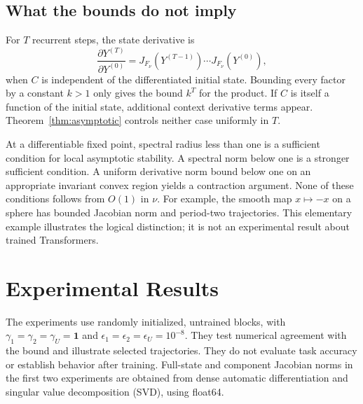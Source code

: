 \documentclass[11pt]{article}
\numberwithin{equation}{section}
\begin{document}
\subsection{What the bounds do not imply}
For $T$ recurrent steps, the state derivative is
\begin{equation}\label{eq:product}
\frac{\partial Y^{(T)}}{\partial Y^{(0)}}
=J_{F_\nu}(Y^{(T-1)})\cdots J_{F_\nu}(Y^{(0)}),
\end{equation}
when $C$ is independent of the differentiated initial state. Bounding every
factor by a constant $k>1$ only gives the bound $k^T$ for the product.
If $C$ is itself a function of the initial state, additional context derivative
terms appear. Theorem~\ref{thm:asymptotic} controls neither case uniformly in $T$.

At a differentiable fixed point, spectral radius less than one is a sufficient
condition for local asymptotic stability. A spectral norm below one is a
stronger sufficient condition. A uniform derivative norm bound below one on an
appropriate invariant convex region yields a contraction argument. None of
these conditions follows from $O(1)$ in $\nu$. For example, the smooth map
$x\mapsto-x$ on a sphere has bounded Jacobian norm and period-two trajectories.
This elementary example illustrates the logical distinction; it is not an
experimental result about trained Transformers.

\section{Experimental Results}
The experiments use randomly initialized, untrained blocks, with
$\gamma_1=\gamma_2=\gamma_U=\mathbf{1}$ and
$\epsilon_1=\epsilon_2=\epsilon_U=10^{-8}$. They test numerical agreement with
the bound and illustrate selected trajectories. They do not evaluate task
accuracy or establish behavior after training. Full-state and component
Jacobian norms in the first two experiments are obtained from dense automatic
differentiation and singular value decomposition (SVD), using float64.
\end{document}
